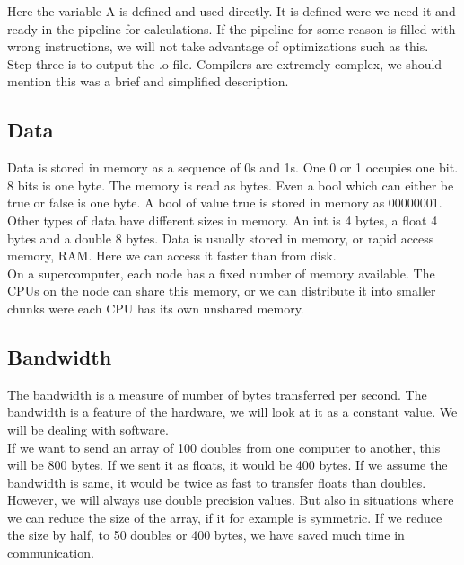 \documentclass[a4paper,norsk,11pt,twoside]{report}
\begin{document}
Here the variable A is defined and used directly. It is defined were we need it and ready in the pipeline for calculations. If the pipeline for some reason is filled with wrong instructions, we will not take advantage of optimizations such as this. \\

Step three is to output the .o file. Compilers are extremely complex, we should mention this was a brief and simplified description. 

\subsection{Data}
Data is stored in memory as a sequence of 0s and 1s. One 0 or 1 occupies one bit. 8 bits is one byte. The memory is read as bytes. Even a bool which can either be true or false is one byte. A bool of value true is stored in memory as 00000001. \\

Other types of data have different sizes in memory. An int is 4 bytes, a float 4 bytes and a double 8 bytes. Data is usually stored in memory, or rapid access memory, RAM. Here we can access it faster than from disk. \\

On a supercomputer, each node has a fixed number of memory available. The CPUs on the node can share this memory, or we can distribute it into smaller chunks were each CPU has its own unshared memory. 

\subsection{Bandwidth}
The bandwidth is a measure of number of bytes transferred per second. The bandwidth is a feature of the hardware, we will look at it as a constant value. We will be dealing with software. \\

If we want to send an array of 100 doubles from one computer to another, this will be 800 bytes. If we sent it as floats, it would be 400 bytes. If we assume the bandwidth is same, it would be twice as fast to transfer floats than doubles. \\

However, we will always use double precision values. But also in situations where we can reduce the size of the array, if it for example is symmetric. If we reduce the size by half, to 50 doubles or 400 bytes, we have saved much time in communication. \\
\end{document}
